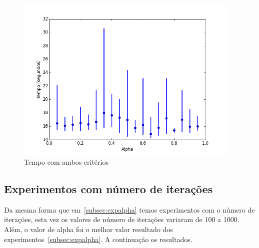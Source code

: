 		\begin{figure}[H]
			\centering
			\includegraphics[height=8cm]{images/time_both_alpha}
			\caption{Tempo com ambos critérios}
			\label{fig:timebothalpha}
		\end{figure}

 \subsection{Experimentos com número de iterações}
 	Da mesma forma que em~\ref{subsec:expalpha} temos experimentos com o número de iterações, esta vez os valores de número de iterações variaram de 100 a 1000. Além, o valor de alpha foi o melhor valor resultado dos experimentos~\ref{subsec:expalpha}. A continuação os resultados.
	
		
